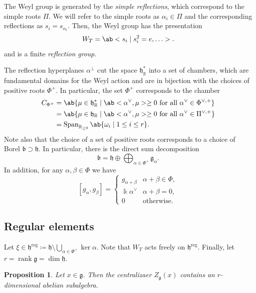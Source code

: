 \documentclass{amsart}
\newtheorem{prop}[thm]{Proposition}
\theoremstyle{definition}
\theoremstyle{remark}
\theoremstyle{plain}
\theoremstyle{definition}
\theoremstyle{remark}
\newcommand{\R}{\mathbb{R}}
\renewcommand{\k}{\Bbbk}
\newcommand{\g}{\mathfrak{g}}
\newcommand{\h}{\mathfrak{h}}
\renewcommand{\b}{\mathfrak{b}}
\newcommand{\on}[1]{\operatorname{#1}}
\newcommand{\1}{\mathbf{1}}
\newcommand{\2}{\mathbf{2}}
\newcommand{\3}{\mathbf{3}}
\begin{document}
The Weyl group is generated by the \textit{simple reflections}, which correspond to the simple roots \(\Pi\). We will refer to the simple roots as \(\alpha_i \in \Pi\) and the corresponding reflections as \(s_i = s_{\alpha_i}\). Then, the Weyl group has the presentation
\[ W_T = \ab<s_i \mid s_i^2 = e, \ldots >. \]
and is a finite \textit{reflection group}.

The reflection hyperplanes \(\alpha^{\perp}\) cut the space \(\h^*_{\R}\) into a set of chambers, which are fundamental domains for the Weyl action and are in bijection with the choices of positive roots \(\Phi^+\). 
In particular, the set \(\Phi^+\) corresponds to the chamber
\begin{align*}
    C_{\Phi^+} &= \ab\{ \mu \in \h^*_{\R} \mid \ab<\alpha^{\vee}, \mu> \geq 0 \text{ for all } \alpha^{\vee} \in \Phi^{\vee, +} \} \\
    &= \ab\{ \mu \in \h_{\R} \mid \ab<\alpha^{\vee}, \mu> \geq 0 \text{ for all } \alpha^{\vee} \in \Pi^{\vee, +} \} \\
    &= \on{Span}_{\R_{\geq 0}} \ab\{ \omega_i \mid 1 \leq i \leq r \}.
\end{align*}
Note also that the choice of a set of positive roots corresponds to a choice of Borel \(\b \supset \h\). In particular, there is the direct sum decomposition
\[ \b = \h \oplus \bigoplus_{\alpha \in \Phi^+} \g_{\alpha}. \]
In addition, for any \(\alpha, \beta \in \Phi\) we have
\[ [g_{\alpha}, g_{\beta}] = \begin{cases}
    g_{\alpha + \beta} & \alpha + \beta \in \Phi, \\
    \k \alpha^{\vee} & \alpha + \beta = 0, \\
    0 & \text{otherwise}.
\end{cases} \]

\subsection{Regular elements}%
\label{sub:Regular elements}

Let \(\xi \in \h^{\on{reg}} \coloneqq \h \setminus \bigcup_{\alpha \in \Phi^+} \ker \alpha\). Note that \(W_T\) acts freely on \(\h^{\on{reg}}\). Finally, let \(r = \on{rank} \g = \dim \h\).

\begin{prop}
    Let \(x \in \g\). Then the centralizaer \(Z_{\g}(x)\) contains an \(r\)-dimensional abelian subalgebra.
\end{prop}
\end{document}
